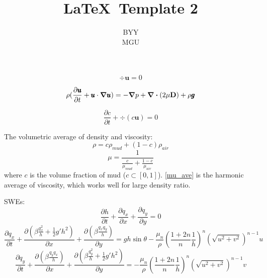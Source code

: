 \documentclass{article}
\begin{document}

\title{\LaTeX\   Template 2} %
\author{BYY\\MGU} %

\maketitle

\begin{equation}
	\div{\pmb{u}}=0
	\label{ns1}
\end{equation}

\begin{equation}
	\rho(\frac{\partial \pmb{u}}{\partial t}+\pmb{u} \cdot {\grad{\pmb{u}}})=-\grad{p}+\div{(2\mu \vb{D})}+\rho \pmb{g}
	\label{ns2}
\end{equation}

\begin{equation}
	\frac{\partial c}{\partial t}+\div{(c\pmb{u})}=0
	\label{ns3}
\end{equation}	

The volumetric average of density and viscosity:
\begin{equation}
	\rho = c\rho_{mud}+(1-c)\rho_{air}
	\label{c_ave}
\end{equation}
\begin{equation}
	\mu = \frac{1}{\frac{c}{\mu_{mud}}+\frac{1-c}{\mu_{air}}}
	\label{mu_ave}
\end{equation}
where $c$ is the volume fraction of mud ($c\subset [0,1]$). \autoref{mu_ave} is the harmonic  average of viscosity, which works well for large density ratio.

SWEs:
\begin{equation}
	\frac{\partial h}{\partial t}+\frac{\partial q_x}{\partial x}+\frac{\partial q_y}{\partial y}=0
	\label{pl_1}
\end{equation}
\begin{equation}
	\frac{\partial q_x}{\partial t}+\frac{\partial (\beta\frac{q_x^2}{h}+\frac{1}{2}g'h^2)}{\partial x}+\frac{\partial (\beta\frac{q_xq_y}{h})}{\partial y}=gh\sin\theta-\frac{\mu_n}{\rho} (\frac{1+2n}{n }\frac{1}{h})^n(\sqrt{u^2+v^2})^{n-1}u
	\label{pl_2}
\end{equation}
\begin{equation}
	\frac{\partial q_y}{\partial t}+\frac{\partial (\beta\frac{q_yq_x}{h})}{\partial x}+\frac{\partial (\beta\frac{q_y^2}{h}+\frac{1}{2}g'h^2)}{\partial y}=-\frac{\mu_n}{\rho} (\frac{1+2n}{n  }\frac{1}{h})^n(\sqrt{u^2+v^2})^{n-1}v
	\label{pl_3}
\end{equation}
\end{document}
